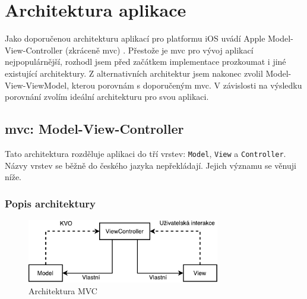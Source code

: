 \section{Architektura aplikace}\label{analyza-architektura}

Jako doporučenou architekturu aplikací pro platformu iOS uvádí Apple Model-View-Controller (zkráceně \acrshort{mvc}) \cite{gc-apple-recommends}.
Přestože je \acrshort{mvc} pro vývoj aplikací nejpopulárnější, rozhodl jsem před začátkem implementace prozkoumat i jiné existující architektury.
Z alternativních architektur jsem nakonec zvolil Model-View-ViewModel, kterou porovnám s doporučeným \acrshort{mvc}.
V závislosti na výsledku porovnání zvolím ideální architekturu pro svou aplikaci.

\subsection{\acrshort{mvc}: Model-View-Controller}\label{analyza-mvc}
Tato architektura rozděluje aplikaci do tří vrstev: \texttt{Model}, \texttt{View} a \texttt{Controller}.
Názvy vrstev se běžně do českého jazyka nepřekládají.
Jejich významu se věnuji níže.

\subsubsection*{Popis architektury}

\begin{figure}\centering
	\includegraphics[width=0.75\textwidth]{assets/analysis-mvc-architecture.pdf}
	\caption{Architektura MVC}\label{fig:architektura-mvc}
\end{figure}

